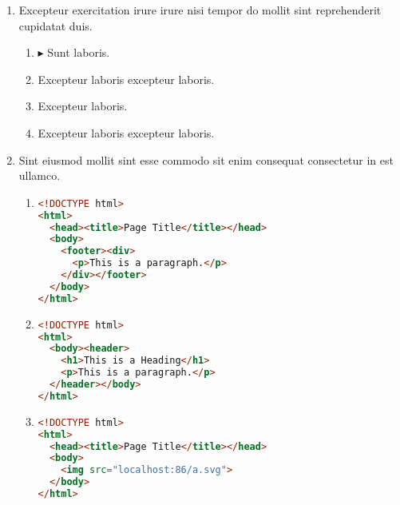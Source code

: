 \documentclass[a4paper,12pt]{article}
\begin{document}
\begin{enumerate}[label=\textbf{\arabic*.}]
\begin{multicols}{2}
\begin{enumerate}
		\item  Excepteur laboris excepteur laboris.
  
		\item  Excepteur laboris excepteur laboris.
    
	\end{enumerate}

\end{multicols}
\item Excepteur exercitation irure irure nisi tempor do mollit sint reprehenderit cupidatat duis.
\begin{multicols}{2}
	\begin{enumerate}
		\item $\blacktriangleright$  Sunt laboris.
    
		\item  Excepteur laboris excepteur laboris.
  
		\item  Excepteur laboris.
    
		\item  Excepteur laboris excepteur laboris.
    
	\end{enumerate}

\end{multicols}
\item Sint eiusmod mollit sint esse commodo sit enim consequat consectetur in est ullamco.
	\begin{enumerate}
		\item  \hfill \vspace*{-7mm}
    \begin{lstlisting}[language=HTML]
<!DOCTYPE html>
<html>
  <head><title>Page Title</title></head>
  <body>
    <footer><div>
      <p>This is a paragraph.</p>
    </div></footer>
  </body>
</html>
    \end{lstlisting}
  
		\item  \hfill \vspace*{-7mm}
    \begin{lstlisting}[language=HTML]
<!DOCTYPE html> 
<html>
  <body><header>
    <h1>This is a Heading</h1>
    <p>This is a paragraph.</p>
  </header></body>
</html>
    \end{lstlisting}
    
		\item  \hfill \vspace*{-7mm}
    \begin{lstlisting}[language=HTML]
<!DOCTYPE html>
<html>
  <head><title>Page Title</title></head>
  <body>
    <img src="localhost:86/a.svg">
  </body>
</html>
    \end{lstlisting}
    

\end{enumerate}
\end{enumerate}
\end{document}
